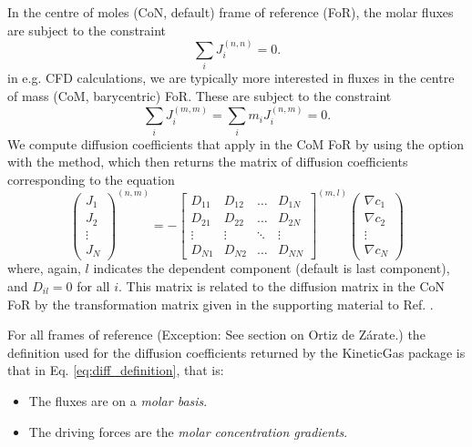 In the centre of moles (CoN, default) frame of reference (FoR), the molar fluxes are subject to the constraint
\begin{equation}
    \sum_i J_i^{(n, n)} = 0.
\end{equation}
in e.g. CFD calculations, we are typically more interested in fluxes in the centre of mass (CoM, barycentric) FoR. These are subject to the constraint
\begin{equation}
    \sum_i J_i^{(m, m)} = \sum_i m_i J_i^{(n, m)} = 0.
\end{equation}
We compute diffusion coefficients that apply in the CoM FoR by using the option  with the  method, which then returns the matrix of diffusion coefficients corresponding to the equation
\begin{equation}
    \begin{pmatrix}J_1 \\ J_2 \\ \vdots \\ J_N \end{pmatrix}^{(n, m)} = -
    \begin{bmatrix}
    D_{11} & D_{12} & \hdots & D_{1N} \\
    D_{21} & D_{22} & \hdots & D_{2N} \\
    \vdots & \vdots & \ddots & \vdots \\
    D_{N1} & D_{N2} & \hdots & D_{NN}
    \end{bmatrix}^{(m, l)}
    \begin{pmatrix}\nabla c_1 \\ \nabla c_2 \\ \vdots \\ \nabla c_N \end{pmatrix}
\end{equation}
where, again, $l$ indicates the dependent component (default is last component), and $D_{il} = 0$ for all $i$. This matrix is related to the diffusion matrix in the CoN FoR by the transformation matrix given in the supporting material to Ref. \cite{retmie}.

For all frames of reference (Exception: See section on Ortiz de Zárate.) the definition used for the diffusion coefficients returned by the KineticGas package is that in Eq. \eqref{eq:diff_definition}, that is:
\begin{itemize}
    \item The fluxes are on a \textit{molar basis}.
    \item The driving forces are the \textit{molar concentration gradients}.
\end{itemize}

